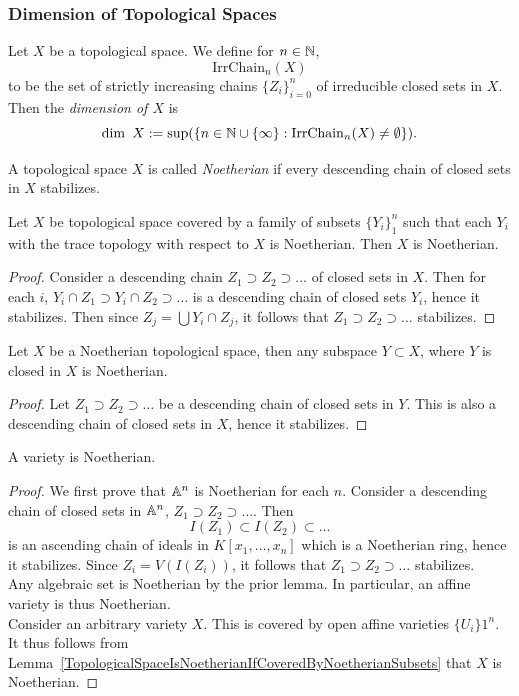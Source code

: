     \subsubsection{Dimension of Topological Spaces}
    \begin{definition}
        Let $X$ be a topological space. We define for $n\in \mathbb{N}$,
        $$
            \mathrm{IrrChain}_n(X)
        $$
        to be the set of strictly increasing chains $\{Z_i\}_{i=0}^n$ of irreducible closed sets in $X$.
        Then the \emph{dimension of $X$} is
        $$
            \dim\ X := \sup(\{n \in \mathbb{N} \cup\{\infty\}: \mathrm{IrrChain}_n(X)\neq \emptyset\}).
        $$
    \end{definition}
    \begin{definition}
        A topological space $X$ is called \emph{Noetherian} if every descending chain of closed sets in $X$ stabilizes. 
    \end{definition}
    \begin{lemma}\label{TopologicalSpaceIsNoetherianIfCoveredByNoetherianSubsets}
        Let $X$ be topological space covered by a family of subsets $\{Y_i\}_1^n$ such that each $Y_i$ with the trace topology with respect to $X$ is Noetherian. Then $X$ is Noetherian. 
    \end{lemma}
    \begin{proof}
        Consider a descending chain $Z_1\supset Z_2\supset \dots$ of closed sets in $X$. Then for each $i$, $Y_i\cap Z_1\supset Y_i\cap Z_2\supset \dots$ is a descending chain of closed sets $Y_i$, hence it stabilizes. Then since $Z_j = \bigcup Y_i\cap Z_j$, it follows that $Z_1\supset Z_2\supset \dots$ stabilizes. 
    \end{proof}
    \begin{lemma}
        Let $X$ be a Noetherian topological space, then any subspace $Y\subset X$, where $Y$ is closed in $X$ is Noetherian.
    \end{lemma}
    \begin{proof}
        Let $Z_1 \supset Z_2\supset \dots$ be a descending chain of closed sets in $Y$. This is also a descending chain of closed sets in $X$, hence it stabilizes.
    \end{proof}
    \begin{lemma}
        A variety is Noetherian. 
    \end{lemma}
    \begin{proof}
        We first prove that $\mathbb{A}^n$ is Noetherian for each $n$. Consider a descending chain of closed sets in $\mathbb{A}^n$, $Z_1\supset Z_2\supset \dots$. Then 
        $$
            I(Z_1)\subset I(Z_2)\subset \dots
        $$
        is an ascending chain of ideals in $K[x_1,\dots,x_n]$ which is a Noetherian ring, hence it stabilizes. Since $Z_i=V(I(Z_i))$, it follows that $Z_1\supset Z_2\supset \dots$ stabilizes.\\
        Any algebraic set is Noetherian by the prior lemma. In particular, an affine variety is thus Noetherian.\\  
        Consider an arbitrary variety $X$. This is covered by open affine varieties $\{U_i\}1^n$. It thus follows from Lemma~\ref{TopologicalSpaceIsNoetherianIfCoveredByNoetherianSubsets} that $X$ is Noetherian.  
    \end{proof}
